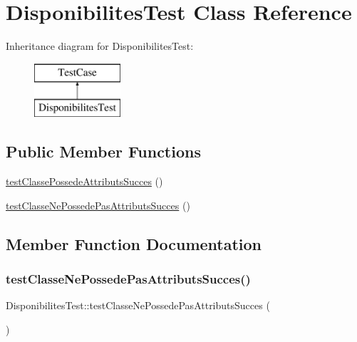 \hypertarget{class_disponibilites_test}{}\section{Disponibilites\+Test Class Reference}
\label{class_disponibilites_test}
Inheritance diagram for Disponibilites\+Test\+:\begin{figure}[H]
\begin{center}
\leavevmode
\includegraphics[height=2.000000cm]{class_disponibilites_test}
\end{center}
\end{figure}
\subsection*{Public Member Functions}
\begin{DoxyCompactItemize}
\item 
\hyperlink{class_disponibilites_test_a935a6b85c781072a4bff6478af6c5f3d}{test\+Classe\+Possede\+Attributs\+Succes} ()
\item 
\hyperlink{class_disponibilites_test_a333913d410844dceaacad40cc7c30993}{test\+Classe\+Ne\+Possede\+Pas\+Attributs\+Succes} ()
\end{DoxyCompactItemize}


\subsection{Member Function Documentation}
\mbox{\label{class_disponibilites_test_a333913d410844dceaacad40cc7c30993}} 
\subsubsection{\texorpdfstring{test\+Classe\+Ne\+Possede\+Pas\+Attributs\+Succes()}{testClasseNePossedePasAttributsSucces()}}
{\footnotesize\ttfamily Disponibilites\+Test\+::test\+Classe\+Ne\+Possede\+Pas\+Attributs\+Succes (\begin{DoxyParamCaption}{ }\end{DoxyParamCaption})}

